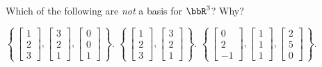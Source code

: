 \begin{questions}
  \question Which of the following are \emph{not} a basis for $\bbR^3$?
  Why?
  \begin{choices}
    \choice
    $\displaystyle\left\{\,
      \begin{bmatrix}1\\2\\3\end{bmatrix},
      \begin{bmatrix}3\\2\\1\end{bmatrix},
      \begin{bmatrix}0\\0\\1\end{bmatrix}
      \,\right\}$.
    \choice
    $\displaystyle\left\{\,
      \begin{bmatrix}1\\2\\3\end{bmatrix},
      \begin{bmatrix}3\\2\\1\end{bmatrix}
      \,\right\}$.
    \choice
    $\displaystyle\left\{\,
      \begin{bmatrix}0\\2\\-1\end{bmatrix},
      \begin{bmatrix}1\\1\\1\end{bmatrix},
      \begin{bmatrix}2\\5\\0\end{bmatrix}
      \,\right\}$.
  \end{choices}
\end{questions}

